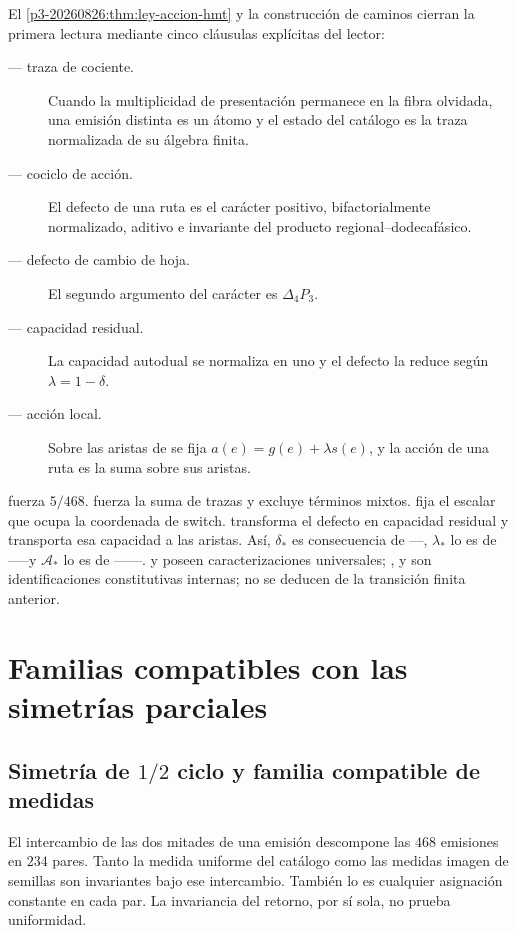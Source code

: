 El \cref{p3-20260826:thm:ley-accion-hmt} y la construcción de caminos cierran la primera
lectura mediante cinco cláusulas explícitas del lector:
\begin{description}
  \item[\HTr --- traza de cociente.] Cuando la multiplicidad de presentación
  permanece en la fibra olvidada, una emisión distinta es un átomo y el
  estado del catálogo es la traza normalizada de su álgebra finita.
  \item[\HAdd --- cociclo de acción.] El defecto de una ruta es el carácter
  positivo, bifactorialmente normalizado, aditivo e invariante del producto
  regional--dodecafásico.
  \item[\HDef --- defecto de cambio de hoja.] El segundo argumento del carácter es
  \(\Delta_4P_3\).
  \item[\HRes --- capacidad residual.] La capacidad autodual se normaliza en
  uno y el defecto la reduce según \(\lambda=1-\delta\).
  \item[\HLoc --- acción local.] Sobre las aristas de \Gtr se fija
  \(a(e)=g(e)+\lambda s(e)\), y la acción de una ruta es la suma sobre sus
  aristas.
\end{description}
\HTr fuerza \(5/468\). \HAdd fuerza la suma de trazas y excluye términos
mixtos. \HDef fija el escalar que ocupa la coordenada de switch. \HRes transforma
el defecto en capacidad residual y \HLoc transporta esa capacidad a las aristas.
Así, \(\delta_*\) es consecuencia de \HTr--\HAdd--\HDef, \(\lambda_*\) lo es de
\HTr--\HAdd--\HDef--\HRes y \(\mathcal A_*\) lo es de
\HTr--\HAdd--\HDef--\HRes--\HLoc. \HTr y \HAdd poseen caracterizaciones universales; \HDef, \HRes y
\HLoc son identificaciones constitutivas internas; no se deducen de la
transición finita anterior.

\section{Familias compatibles con las simetrías parciales}

\subsection{Simetría de \(1/2\) ciclo y familia compatible de medidas}

El intercambio de las dos mitades de una emisión descompone las \(468\)
emisiones en \(234\) pares. Tanto la medida uniforme del catálogo como las
medidas imagen de semillas son invariantes bajo ese intercambio. También lo
es cualquier asignación constante en cada par. La invariancia del retorno,
por sí sola, no prueba uniformidad.

